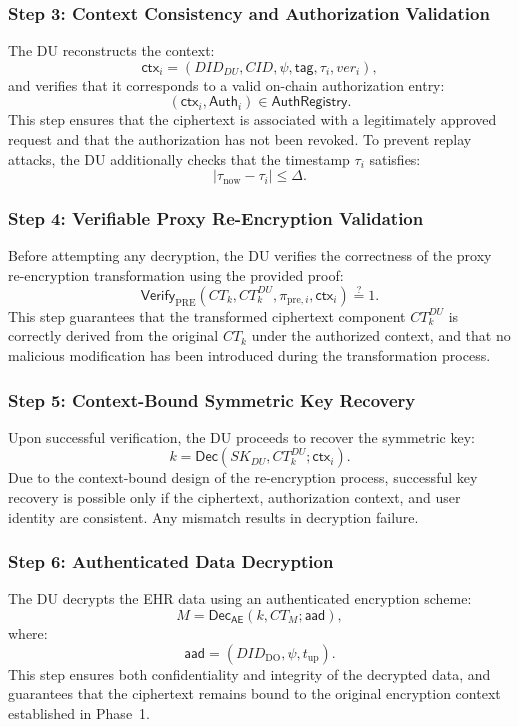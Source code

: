 \documentclass[conference]{IEEEtran}
\begin{document}
\subsubsection*{Step 3: Context Consistency and Authorization Validation}

The DU reconstructs the context:
\[
\mathsf{ctx}_i = (DID_{DU}, CID, \psi, \mathsf{tag}, \tau_i, ver_i),
\]
and verifies that it corresponds to a valid on-chain authorization entry:
\[
(\mathsf{ctx}_i, \mathsf{Auth}_i) \in \textsf{AuthRegistry}.
\]
This step ensures that the ciphertext is associated with a legitimately approved request and that the authorization has not been revoked. To prevent replay attacks, the DU additionally checks that the timestamp $\tau_i$ satisfies:
\[
|\tau_{\text{now}} - \tau_i| \leq \Delta.
\]

\subsubsection*{Step 4: Verifiable Proxy Re-Encryption Validation}

Before attempting any decryption, the DU verifies the correctness of the proxy re-encryption transformation using the provided proof:
\[
\textsf{Verify}_{\text{PRE}}(CT_k, CT_k^{DU}, \pi_{\text{pre},i}, \mathsf{ctx}_i) \stackrel{?}{=} 1.
\]
This step guarantees that the transformed ciphertext component $CT_k^{DU}$ is correctly derived from the original $CT_k$ under the authorized context, and that no malicious modification has been introduced during the transformation process.

\subsubsection*{Step 5: Context-Bound Symmetric Key Recovery}

Upon successful verification, the DU proceeds to recover the symmetric key:
\[
k = \textsf{Dec}(SK_{DU}, CT_k^{DU}; \mathsf{ctx}_i).
\]
Due to the context-bound design of the re-encryption process, successful key recovery is possible only if the ciphertext, authorization context, and user identity are consistent. Any mismatch results in decryption failure.

\subsubsection*{Step 6: Authenticated Data Decryption}

The DU decrypts the EHR data using an authenticated encryption scheme:
\[
M = \textsf{Dec}_{\textsf{AE}}(k, CT_M; \textsf{aad}),
\]
where:
\[
\textsf{aad} = (DID_{\text{DO}}, \psi, t_{\text{up}}).
\]
This step ensures both confidentiality and integrity of the decrypted data, and guarantees that the ciphertext remains bound to the original encryption context established in Phase~1.
\end{document}
